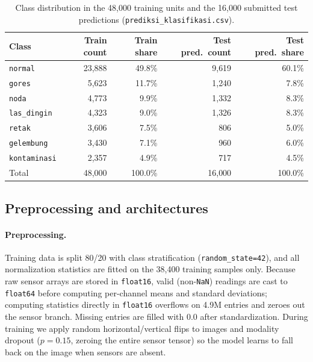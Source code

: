 \begin{table}[t]
  \centering
  \caption{Class distribution in the 48{,}000 training units and the 16{,}000 submitted test
  predictions (\texttt{prediksi\_klasifikasi.csv}).}
  \label{tab:t1-dist}
  \small
  \begin{tabular}{lrrrr}
    \toprule
    Class & Train count & Train share & Test pred.\ count & Test pred.\ share \\
    \midrule
    \texttt{normal}      & 23{,}888 & 49.8\% & 9{,}619 & 60.1\% \\
    \texttt{gores}       &  5{,}623 & 11.7\% & 1{,}240 &  7.8\% \\
    \texttt{noda}        &  4{,}773 &  9.9\% & 1{,}332 &  8.3\% \\
    \texttt{las\_dingin} &  4{,}323 &  9.0\% & 1{,}326 &  8.3\% \\
    \texttt{retak}       &  3{,}606 &  7.5\% &   806   &  5.0\% \\
    \texttt{gelembung}   &  3{,}430 &  7.1\% &   960   &  6.0\% \\
    \texttt{kontaminasi} &  2{,}357 &  4.9\% &   717   &  4.5\% \\
    \midrule
    Total                & 48{,}000 & 100.0\% & 16{,}000 & 100.0\% \\
    \bottomrule
  \end{tabular}
\end{table}

\subsection{Preprocessing and architectures}
\label{sec:t1-arch}

\paragraph{Preprocessing.} Training data is split 80/20 with class stratification
(\texttt{random\_state=42}), and all normalization statistics are fitted on the 38{,}400 training
samples only. Because raw sensor arrays are stored in \texttt{float16}, valid (non-\texttt{NaN})
readings are cast to \texttt{float64} before computing per-channel means and standard deviations;
computing statistics directly in \texttt{float16} overflows on 4.9M entries and zeroes out the sensor
branch. Missing entries are filled with 0.0 after standardization. During training we apply random
horizontal/vertical flips to images and modality dropout ($p=0.15$, zeroing the entire sensor
tensor) so the model learns to fall back on the image when sensors are absent.

